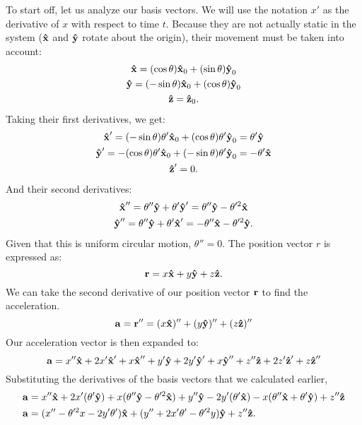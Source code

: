 To start off, let us analyze our basis vectors.
We will use the notation $x'$ as the derivative of $x$ with respect to time $t$.
Because they are not actually static in the system ($\uvec{x}$ and $\uvec{y}$ rotate about the origin), their movement must be taken into account:
\begin{gather*}
	\uvec{x} = (\cos\theta)\uvec{x}_0 + (\sin\theta)\uvec{y}_0 \\
	\uvec{y} = (-\sin\theta)\uvec{x}_0 + (\cos\theta)\uvec{y}_0 \\
	\uvec{z} = \uvec{z}_0 \text{.}
\end{gather*}
Taking their first derivatives, we get:
\begin{gather*}
	\uvec{x}' = (-\sin\theta)\theta'\uvec{x}_0 + (\cos\theta)\theta'\uvec{y}_0 = \theta'\uvec{y} \\
	\uvec{y}' = -(\cos\theta)\theta'\uvec{x}_0 + (-\sin\theta)\theta'\uvec{y}_0 = -\theta'\uvec{x} \\
	\uvec{z}' = 0 \text{.}
\end{gather*}
And their second derivatives:
\begin{gather*}
	\uvec{x}'' = \theta''\uvec{y} + \theta'\uvec{y}' = \theta''\uvec{y} - \theta'^2\uvec{x} \\
	\uvec{y}'' = \theta''\uvec{y} + \theta'\uvec{x}' = -\theta''\uvec{x} - \theta'^2\uvec{y} \text{.}
\end{gather*}
Given that this is uniform circular motion, $\theta'' = 0$.
The position vector $r$ is expressed as:
\begin{equation*}
	\bvec{r} = x\uvec{x} + y\uvec{y} + z\uvec{z} \text{.}
\end{equation*}
We can take the second derivative of our position vector $\bm{\mathbf{r}}$ to find the acceleration.
\begin{equation*}
	\bvec{a} = \bvec{r}'' = (x\uvec{x})'' + (y\uvec{y})'' + (z\uvec{z})''
\end{equation*}
Our acceleration vector is then expanded to:
\begin{equation*}
	\bvec{a} = x''\uvec{x} + 2x'\uvec{x}' + x\uvec{x}'' + y'\uvec{y} + 2y'\uvec{y}' + x\uvec{y}'' + z''\uvec{z} + 2z'\uvec{z}' + z\uvec{z}''
\end{equation*}
Substituting the derivatives of the basis vectors that we calculated earlier,
\begin{align}
	\bvec{a} &= x''\uvec{x} + 2x'(\theta'\uvec{y}) + x(\theta''\uvec{y} - \theta'^2\uvec{x}) + y''\uvec{y} - 2y'(\theta'\uvec{x}) - x(\theta''\uvec{x} + \theta'\uvec{y}) + z''\uvec{z} \nonumber \\
	\bvec{a} &= (x'' - \theta'^2x - 2y'\theta')\uvec{x} + (y'' + 2x'\theta' - \theta'^2y)\uvec{y} + z''\uvec{z} \label{eqn:accel-rotate} \text{.}
\end{align}
